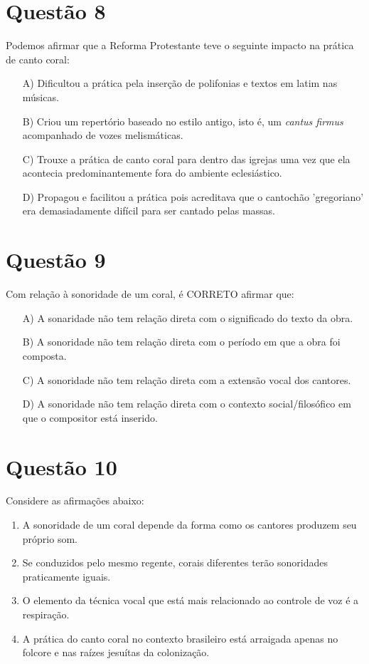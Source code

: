\documentclass[a4paper, 12pt, openright, oneside, english, brazil, article]{abntex2}
\begin{document}
	\section{Questão 8}
	
	Podemos afirmar que a Reforma Protestante teve o seguinte impacto na prática de canto coral:
	
	\begin{enumerate}
		\item [A)] Dificultou a prática pela inserção de polifonias e textos em latim nas músicas.
		\item [B)] Criou um repertório baseado no estilo antigo, isto é, um \textit{cantus firmus} acompanhado de vozes melismáticas.
		\item [C)] Trouxe a prática de canto coral para dentro das igrejas uma vez que ela acontecia predominantemente fora do ambiente eclesiástico.
		\item [D)] Propagou e facilitou a prática pois acreditava que o cantochão 'gregoriano' era demasiadamente difícil para ser cantado pelas massas.
	\end{enumerate}
	
	\section{Questão 9}
	
	Com relação à sonoridade de um coral, é CORRETO afirmar que:
	
	\begin{enumerate}
		\item [A)] A sonaridade não tem relação direta com o significado do texto da obra.
		\item [B)] A sonoridade não tem relação direta com o período em que a obra foi composta.
		\item [C)] A sonoridade não tem relação direta com a extensão vocal dos cantores.
		\item [D)] A sonoridade não tem relação direta com o contexto social/filosófico em que o compositor está inserido.
	\end{enumerate}

	
	\section{Questão 10}
	
	Considere as afirmações abaixo:
	
	\begin{enumerate}
		\item A sonoridade de um coral depende da forma como os cantores produzem seu próprio som.
		\item Se conduzidos pelo mesmo regente, corais diferentes terão sonoridades praticamente iguais.
		\item O elemento da técnica vocal que está mais relacionado ao controle de voz é a respiração.
		\item A prática do canto coral no contexto brasileiro está arraigada apenas no folcore e nas raízes jesuítas da colonização.
	\end{enumerate}
	
\end{document}
